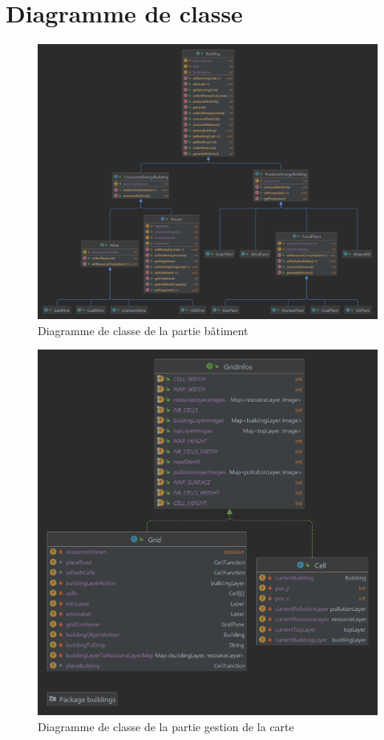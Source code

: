 \newpage
\section{Diagramme de classe}

\begin{figure}[H]
    \centering
    \includegraphics[width=1\linewidth]{images/classBuidling.png}
    \caption{Diagramme de classe de la partie bâtiment}
    \label{fig:classBuilding}
\end{figure}

\begin{figure}[H]
    \centering
    \includegraphics[width=1\linewidth]{images/classGrid.png}
    \caption{Diagramme de classe de la partie gestion de la carte}
    \label{fig:classGrid}
\end{figure}

